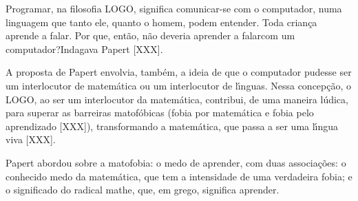 \documentclass[
12pt,		%
openright,	%
twoside,  %
a4paper,			%
chapter=TITLE,		%
english,			%
french,				%
spanish,			%
brazil				%
]{USPSC-classe/USPSC}
\begin{document}
Programar, na filosofia LOGO, significa \textquotedbl comunicar-se com o computador, numa linguagem que tanto ele, quanto o homem,  podem entender\textquotedbl . Toda crian\c{c}a aprende a falar. Por que, ent\~ao, n\~ao deveria aprender a \textquotedbl falar\textquotedbl  com um computador?\textquotedbl  Indagava Papert [XXX].

















A proposta de Papert envolvia, tamb\'em, a ideia de que o computador pudesse ser um interlocutor  de matem\'atica ou um interlocutor de l\'{\i}nguas. Nessa concep\c{c}\~ao, o LOGO, ao ser um interlocutor da matem\'atica, contribui, de uma maneira l\'udica, para superar as barreiras matof\'obicas (fobia por matem\'atica e fobia pelo aprendizado [XXX]), transformando a matem\'atica, que passa a ser uma l\'{\i}ngua viva [XXX].

















Papert abordou sobre a \textquotedbl matofobia: o medo de aprender\textquotedbl , com duas associa\c{c}\~oes: o conhecido medo da matem\'atica, que tem a intensidade de uma verdadeira fobia; e o  significado do radical mathe, que, em grego, significa aprender.


















\noindent\begin{center}\mbox{\centering{}}\end{center}
\end{document}
